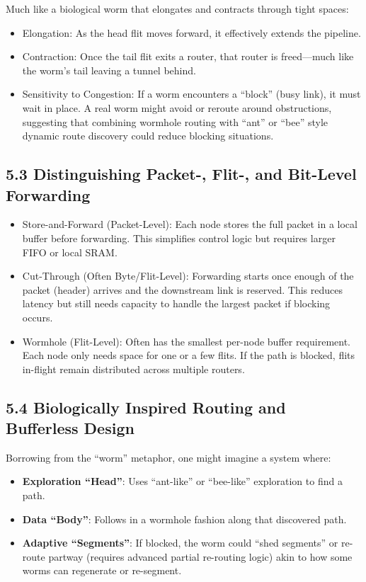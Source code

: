 \documentclass[../../../OAE-SPEC-MAIN.tex]{subfiles}
\begin{document}
Much like a biological worm that elongates and contracts through tight spaces:
\begin{itemize}
	\item Elongation: As the head flit moves forward, it effectively extends the pipeline.
	\item Contraction: Once the tail flit exits a router, that router is freed—much like the worm’s tail leaving a tunnel behind.
	\item Sensitivity to Congestion: If a worm encounters a “block” (busy link), it must wait in place. A real worm might avoid or reroute around obstructions, suggesting that combining wormhole routing with “ant” or “bee” style dynamic route discovery could reduce blocking situations.
\end{itemize}



\subsection{5.3 Distinguishing Packet-, Flit-, and Bit-Level Forwarding}

\begin{itemize}
	\item Store-and-Forward (Packet-Level): Each node stores the full packet in a local buffer before forwarding. This simplifies control logic but requires larger FIFO or local SRAM.
	\item Cut-Through (Often Byte/Flit-Level): Forwarding starts once enough of the packet (header) arrives and the downstream link is reserved. This reduces latency but still needs capacity to handle the largest packet if blocking occurs.
	\item Wormhole (Flit-Level): Often has the smallest per-node buffer requirement. Each node only needs space for one or a few flits. If the path is blocked, flits in-flight remain distributed across multiple routers.
\end{itemize}

\subsection{5.4 Biologically Inspired Routing and Bufferless Design}

Borrowing from the “worm” metaphor, one might imagine a system where:
\begin{itemize}
    \item \textbf{Exploration “Head”}: Uses “ant-like” or “bee-like” exploration to find a path.
    \item \textbf{Data “Body”}: Follows in a wormhole fashion along that discovered path.
    \item \textbf{Adaptive “Segments”}: If blocked, the worm could “shed segments” or re-route partway (requires advanced partial re-routing logic) akin to how some worms can regenerate or re-segment.
\end{itemize}
\end{document}
